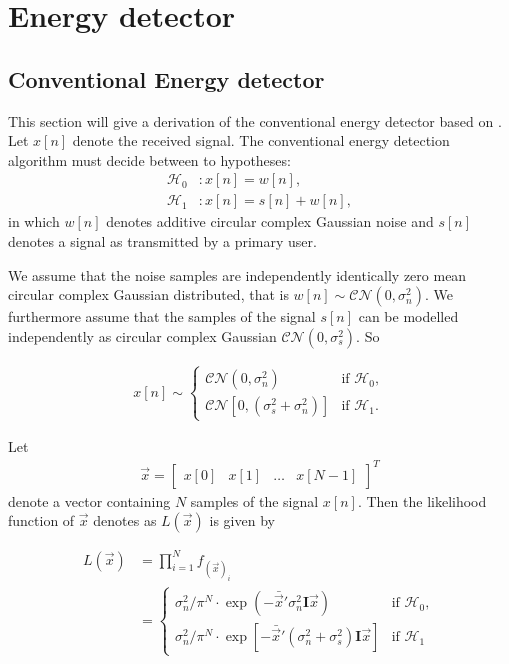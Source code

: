 \documentclass[a4paper, openany, oneside]{memoir}
\begin{document}
\section{Energy detector}

\subsection{Conventional Energy detector}\label{ssec:conv_ed_derivation}
This section will give a derivation of the conventional energy detector based on \cite{atapattu2014energy}.
Let $x[n]$ denote the received signal. The conventional energy detection algorithm must decide between to hypotheses:
\begin{align}\label{eq:hypotheses}
  \mathcal{H}_0&: x[n] = w[n],\\
  \mathcal{H}_1&: x[n] = s[n] + w[n],
\end{align}
in which $w[n]$ denotes additive circular complex Gaussian noise and $s[n]$ denotes a signal as transmitted by a primary user.

We assume that the noise samples are independently identically zero mean circular complex Gaussian distributed, that is $w[n] \sim \mathcal{CN}(0, \sigma_n^2)$. 
We furthermore assume that the samples of the signal $s[n]$ can be modelled independently as circular complex Gaussian $\mathcal{CN}(0, \sigma_s^2)$. %
So

\begin{align*}
x[n] \sim 
    \begin{cases}
        \mathcal{CN}(0, \sigma_n^2) & \text{if $\mathcal{H}_0$}, \\
        \mathcal{CN}[0, (\sigma_s^2 + \sigma_n^2)] & \text{if $\mathcal{H}_1$}.
    \end{cases}
\end{align*} 

Let
\begin{align*}
    \vec{x} = \begin{bmatrix}x[0] & x[1] & \ldots & x[N-1]\end{bmatrix}^T
\end{align*}
denote a vector containing $N$ samples of the signal $x[n]$. Then the likelihood function of $\vec{x}$ denotes as $L(\vec{x})$ is given by

\begin{align*}
    L(\vec{x}) &= \prod_{i=1}^N f_{(\vec{x})_i}\\
    &= \begin{cases}
        \sigma_n^2/\pi^N \cdot \exp(-\bar{\vec{x}}'\sigma_n^2\mathbf{I}\vec{x}) & \text{if $\mathcal{H}_0$}, \\
        \sigma_n^2/\pi^N \cdot \exp[-\bar{\vec{x}}'(\sigma_n^2+\sigma_s^2)\mathbf{I}\vec{x}] & \text{if $\mathcal{H}_1$}
    \end{cases}
\end{align*}
\end{document}
